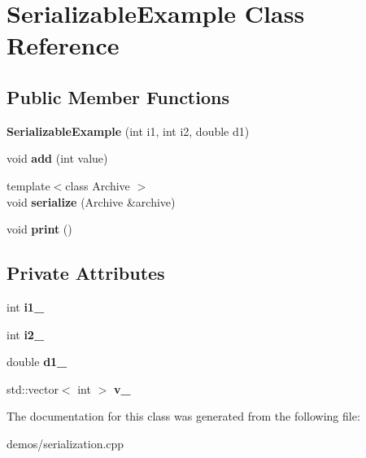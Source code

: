 \hypertarget{classSerializableExample}{}\section{Serializable\+Example Class Reference}
\label{classSerializableExample}
\subsection*{Public Member Functions}
\begin{DoxyCompactItemize}
\item 
\mbox{\label{classSerializableExample_a020d465dad63e984c2d665f5e59f7b85}} 
{\bfseries Serializable\+Example} (int i1, int i2, double d1)
\item 
\mbox{\label{classSerializableExample_ad31bb675456f6d5ff330c0a9ed44935f}} 
void {\bfseries add} (int value)
\item 
\mbox{\label{classSerializableExample_abd83ad2d93905e446c27faa83ccc27c4}} 
{\footnotesize template$<$class Archive $>$ }\\void {\bfseries serialize} (Archive \&archive)
\item 
\mbox{\label{classSerializableExample_a045de0e6c3f89f14f0b088dd8978bce2}} 
void {\bfseries print} ()
\end{DoxyCompactItemize}
\subsection*{Private Attributes}
\begin{DoxyCompactItemize}
\item 
\mbox{\label{classSerializableExample_ab92737737108ec75894cdd774f382456}} 
int {\bfseries i1\+\_\+}
\item 
\mbox{\label{classSerializableExample_ac5b8225f7afd034537b83b9556f6e7ed}} 
int {\bfseries i2\+\_\+}
\item 
\mbox{\label{classSerializableExample_a6e0725b030db00c68689de4f2d23edfe}} 
double {\bfseries d1\+\_\+}
\item 
\mbox{\label{classSerializableExample_a6704295d511ce08e60005e153ca39b9a}} 
std\+::vector$<$ int $>$ {\bfseries v\+\_\+}
\end{DoxyCompactItemize}


The documentation for this class was generated from the following file\+:\begin{DoxyCompactItemize}
\item 
demos/serialization.\+cpp\end{DoxyCompactItemize}
